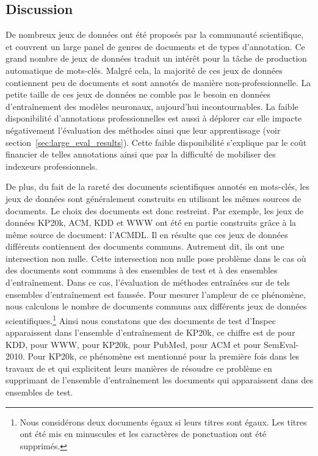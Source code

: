 \subsection{Discussion}
\label{sec:framework_datasets_discussion}
De nombreux jeux de données ont été proposés par la communauté scientifique, et couvrent un large panel de genres de documents et de types d'annotation.
Ce grand nombre de jeux de données traduit un intérêt pour la tâche de production automatique de mots-clés. Malgré cela, la majorité de ces jeux de données contiennent peu de documents et sont annotés de manière non-professionnelle.
La petite taille de ces jeux de données ne comble pas le besoin en données d'entraînement des modèles neuronaux, aujourd'hui incontournables.
La faible disponibilité d'annotations professionnelles est aussi à déplorer car elle impacte négativement l'évaluation des méthodes ainsi que leur apprentissage (voir section~\ref{sec:large_eval_results}).
Cette faible disponibilité s'explique par le coût financier de telles annotations ainsi que par la difficulté de mobiliser des indexeurs professionnels.

De plus, du fait de la rareté des documents scientifiques annotés en mots-clés, les jeux de données sont généralement construits en utilisant les mêmes sources de documents. Le choix des documents est donc restreint.
Par exemple, les jeux de données KP20k, ACM, KDD et WWW ont été en partie construits grâce à la même source de document: l'ACM\;DL. Il en résulte que ces jeux de données différents contiennent des documents communs. Autrement dit, ils ont une intersection non nulle.
Cette intersection non nulle pose problème dans le cas où des documents sont communs à des ensembles de test et à des ensembles d'entraînement.
Dans ce cas, l'évaluation de méthodes entraînées sur de tels ensembles d'entraînement est faussée.
Pour mesurer l'ampleur de ce phénomène, nous calculons le nombre de documents communs aux différents jeux de données scientifiques.\footnote{Nous considérons deux documents égaux si leurs titres sont égaux. Les titres ont été mis en minuscules et les caractères de ponctuation ont été supprimés.}
Ainsi nous constatons que  des documents de test d'Inspec apparaissent dans l'ensemble d'entraînement de KP20k, ce chiffre est de  pour KDD,  pour WWW,  pour KP20k,  pour PubMed,  pour ACM et  pour SemEval-2010.
Pour KP20k, ce phénomène est mentionné pour la première fois dans les travaux de \citet{chen_integrated_2019} et \citet{chan_neural_2019} qui explicitent leurs manières de résoudre ce problème en supprimant de l'ensemble d'entraînement les documents qui apparaissent dans des ensembles de test.


